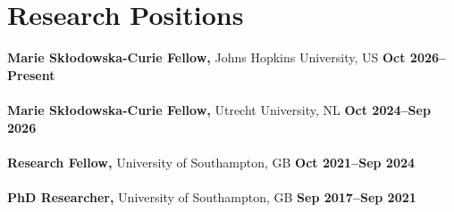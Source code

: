 \section{Research Positions}

\textbf{Marie Sk{\l}odowska-Curie Fellow,} Johns Hopkins University, US
\hfill \textbf{Oct 2026--Present} \\
\\
\textbf{Marie Sk{\l}odowska-Curie Fellow,} Utrecht University, NL
\hfill \textbf{Oct 2024--Sep 2026} \\
\\
\textbf{Research Fellow,} University of Southampton, GB
\hfill \textbf{Oct 2021--Sep 2024} \\
\\
\textbf{PhD Researcher,} University of Southampton, GB
\hfill \textbf{Sep 2017--Sep 2021}%
